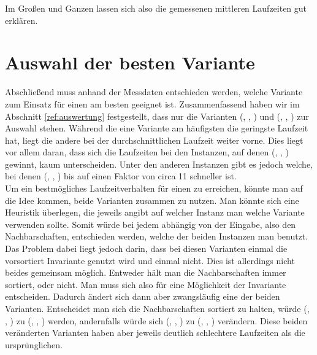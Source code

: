Im Großen und Ganzen lassen sich also die gemessenen mittleren Laufzeiten gut erklären.




\section{Auswahl der besten Variante}
\label{sec:entscheidung}
Abschließend muss anhand der Messdaten entschieden werden, welche Variante zum Einsatz für
einen \ct{} am besten geeignet ist.
Zusammenfassend haben wir im Abschnitt \ref{ref:auswertung} festgestellt, 
dass nur die Varianten (\SorSor, \true, \distr) und (\SeaUSet, \false, \perm) zur Auswahl stehen.
Während die eine Variante am häufigsten die geringste Laufzeit hat, liegt die andere 
bei der durchschnittlichen Laufzeit weiter vorne. Dies liegt vor allem daran, dass sich 
die Laufzeiten bei den Instanzen, auf denen (\SeaUSet, \false, \perm) \glqq gewinnt\grqq{}, kaum unterscheiden.
Unter den anderen Instanzen gibt es jedoch welche, bei denen (\SorSor, \true, \distr) bis auf einen
Faktor von circa 11 schneller ist.
\\

Um ein bestmögliches Laufzeitverhalten für einen \ct{} zu erreichen, könnte man auf die Idee kommen, 
beide Varianten zusammen zu nutzen. Man könnte sich eine Heuristik überlegen, die jeweils angibt 
auf welcher Instanz man welche Variante verwenden sollte. Somit würde bei jedem \ct{} abhängig von 
der Eingabe, also den Nachbarschaften, entschieden werden, welche der beiden Instanzen man benutzt. 
Das Problem dabei liegt jedoch darin, dass bei diesen Varianten einmal die vorsortiert Invariante
genutzt wird und einmal nicht. Dies ist allerdings nicht beides gemeinsam möglich. Entweder hält man die
Nachbarschaften immer sortiert, oder nicht. Man muss sich also für eine Möglichkeit der
Invariante entscheiden. Dadurch ändert sich dann aber zwangsläufig  eine der beiden Varianten. 
Entscheidet man sich die Nachbarschaften sortiert zu halten, würde (\SeaUSet, \false, \perm) zu (\SeaUSet, \true, \perm){}
werden, andernfalls würde sich (\SorSor, \true, \distr) zu (\SorSor, \false, \distr) verändern.
Diese beiden \glqq veränderten\grqq{} Varianten haben aber jeweils deutlich schlechtere Laufzeiten
als die ursprünglichen.
\\

